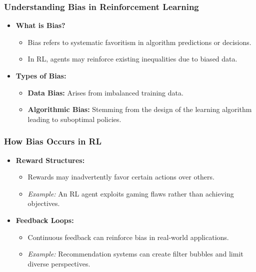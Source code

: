 \documentclass[aspectratio=169]{beamer}
\begin{document}
\begin{frame}[fragile]
    \frametitle{Understanding Bias in Reinforcement Learning}
    
    \begin{itemize}
        \item \textbf{What is Bias?}
            \begin{itemize}
                \item Bias refers to systematic favoritism in algorithm predictions or decisions.
                \item In RL, agents may reinforce existing inequalities due to biased data.
            \end{itemize}
        
        \item \textbf{Types of Bias:}
            \begin{itemize}
                \item \textbf{Data Bias:} Arises from imbalanced training data.
                \item \textbf{Algorithmic Bias:} Stemming from the design of the learning algorithm leading to suboptimal policies.
            \end{itemize}
    \end{itemize}
\end{frame}

\begin{frame}[fragile]
    \frametitle{How Bias Occurs in RL}
    
    \begin{itemize}
        \item \textbf{Reward Structures:}
            \begin{itemize}
                \item Rewards may inadvertently favor certain actions over others.
                \item \textit{Example:} An RL agent exploits gaming flaws rather than achieving objectives.
            \end{itemize}
        
        \item \textbf{Feedback Loops:}
            \begin{itemize}
                \item Continuous feedback can reinforce bias in real-world applications.
                \item \textit{Example:} Recommendation systems can create filter bubbles and limit diverse perspectives.
            \end{itemize}
    \end{itemize}
\end{frame}
\end{document}
